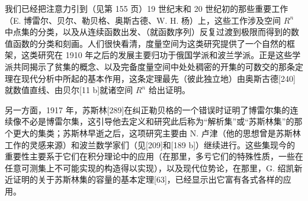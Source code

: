 我们已经把注意力引到（见第 155 页）19 世纪末和 20 世纪初的那些重要工作（E. 博雷尔、贝尔、勒贝格、奥斯古德、W. H. 杨）上，这些工作涉及空间 \(R^{n}\) 中点集的分类，以及从连续函数出发、（就函数序列）反复过渡到极限而得到的数值函数的分类和刻画。人们很快看清，度量空间为这类研究提供了一个自然的框架，这类研究在 1910 年之后的发展主要归功于俄国学派和波兰学派。正是这些学派共同揭示了贫集的概念、以及完备度量空间中处处稠密的开集的可数交的那条定理在现代分析中所起的基本作用，这条定理最先（彼此独立地）由奥斯古德{[}240{]}就数值直线、由贝尔{[}11 b{]}就诸空间 \(R^{n}\) 给出证明。

另一方面，1917 年，苏斯林{[}289{]}在纠正勒贝格的一个错误时证明了博雷尔集的连续像不必是博雷尔集，这引导他去定义和研究此后称为“解析集”或“苏斯林集”的那个更大的集类；苏斯林早逝之后，这项研究主要由 N. 卢津（他的思想曾是苏斯林工作的灵感来源）和波兰数学家们（见{[}209{]}和{[}189 b{]}）继续进行。这些集现今的重要性主要系于它们在积分理论中的应用（在那里，多亏它们的特殊性质，一些在任意可测集上不可能实现的构造得以实现），以及现代位势论，在那里，G. 绍凯新近证明的关于苏斯林集的容量的基本定理{[}63{]}，已经显示出它富有各式各样的应用。
